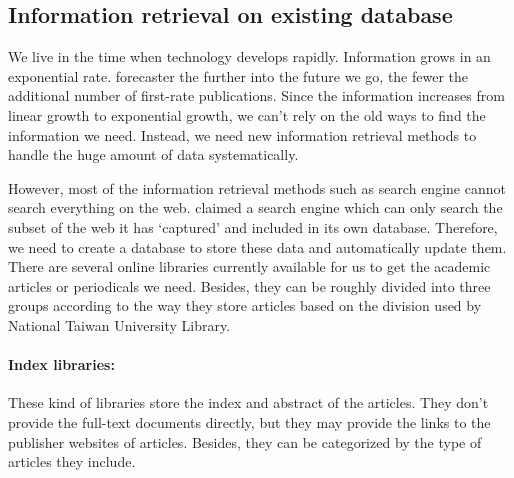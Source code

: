 	
\subsection{Information retrieval on existing database}
	We live in the time when technology develops rapidly. Information grows in an exponential rate. \cite{Tague1981} forecaster the further into the future we go, the fewer the additional number of first-rate publications. 
	Since the information increases from linear growth to exponential growth, we can't rely on the old ways to find the information we need. 
	Instead, we need new information retrieval methods to handle the huge amount of data systematically. 
	
	However, most of the information retrieval methods such as search engine cannot search everything on the web. 
	\cite{Grehan2002} claimed a search engine which can only search the subset of the web it has ‘captured’ and included in its own database. 
	Therefore, we need to create a database to store these data and automatically update them.
	There are several online libraries currently available for us to get the academic articles or periodicals we need.
	Besides, they can be roughly divided into three groups according to the way they store articles based on the division used by National Taiwan University Library.\\

\paragraph{Index libraries:}
	These kind of libraries store the index and abstract of the articles.
	They don't provide the full-text documents directly, but they may provide the links to the publisher websites of articles.
	Besides, they can be categorized by the type of articles they include.
	
